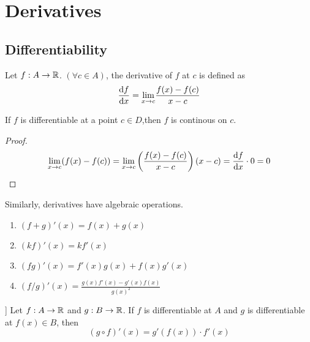 \chapter{Derivatives}
\section{Differentiability}
\begin{definition} Let $f : A \to {\mathbb{R}}$. $(\forall c \in A)$, the derivative of $f$ at $c$ is defined as
    \[\dv{f}{x}= \underset{x \to c}{\lim} \frac{f(x) - f(c)}{x-c}\]
\end{definition}
\begin{theorem}
    If $f$ is differentiable at a point $c \in D$,then $f$ is continous on $c$.
    \begin{proof}
        \[\underset{x \to c}{\lim} (f(x) - f(c) )= \underset{x \to c}{\lim}\left( \frac{f(x)-f(c)}{x-c} \right) (x-c) = \dv{f}{x} \cdot 0 = 0\]
    \end{proof}
\end{theorem}

\begin{theorem} Similarly, derivatives have algebraic operations.
    \begin{enumerate}
        \item $(f+g)'(x) = f(x) + g(x)$
        \item $(kf)'(x) = k f'(x)$
        \item $(fg)'(x) = f'(x)g(x) + f(x)g'(x) $
        \item $(f/g)'(x)= \frac{g(x)f'(x) - g'(x)f(x)}{g(x)^2}$
    \end{enumerate}
\end{theorem}

\begin{theorem}] Let $f: A \to {\mathbb{R}}$ and $g: B \to {\mathbb{R}}$. If $f$ is differentiable at $A$ and $g$ is differentiable at $f(x) \in B$, then
    \[ (g \circ f)'(x)= g'(f(x)) \cdot f'(x)\]
\end{theorem}
